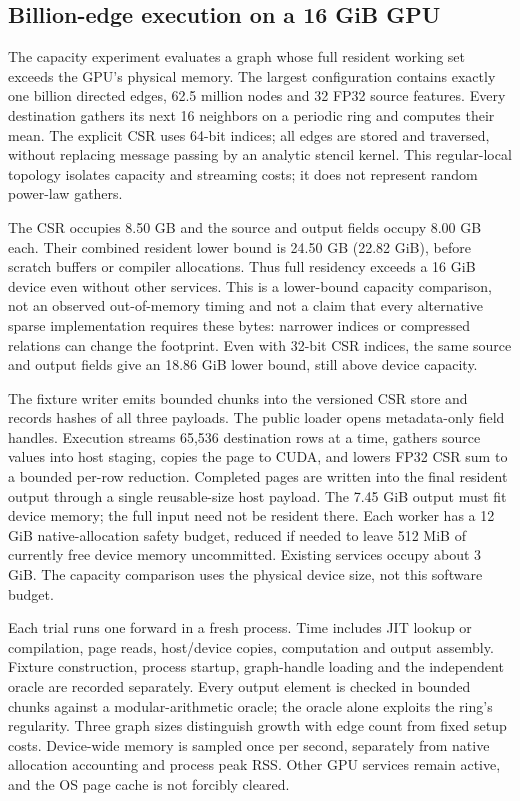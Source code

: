 \subsection{Billion-edge execution on a 16 GiB GPU}
\label{sec:gpu-paging}
The capacity experiment evaluates a graph whose full resident working set
exceeds the GPU's physical memory. The largest configuration contains exactly
one billion directed edges, 62.5 million nodes and 32 FP32 source features.
Every destination gathers its next 16 neighbors on a periodic ring and computes
their mean. The explicit CSR uses 64-bit indices; all edges are stored and
traversed, without replacing message passing by an analytic stencil kernel.
This regular-local topology isolates capacity and streaming costs; it does not
represent random power-law gathers.

The CSR occupies 8.50 GB and the source and output fields occupy 8.00 GB each.
Their combined resident lower bound is 24.50 GB (22.82 GiB), before scratch
buffers or compiler allocations. Thus full residency exceeds a 16 GiB device
even without other services. This is a lower-bound capacity comparison, not
an observed out-of-memory timing and not a claim that every alternative sparse
implementation requires these bytes: narrower indices or compressed relations
can change the footprint. Even with 32-bit CSR indices, the same source and
output fields give an 18.86 GiB lower bound, still above device capacity.

The fixture writer emits bounded chunks into the versioned CSR store and
records hashes of all three payloads. The public loader opens metadata-only
field handles. Execution streams 65,536 destination rows at a time, gathers
source values into host staging, copies the page to CUDA, and lowers FP32 CSR
sum to a bounded per-row reduction. Completed pages are written into the final
resident output through a single reusable-size host payload. The 7.45 GiB
output must fit device memory; the full input need not be resident there.
Each worker has a 12 GiB native-allocation safety budget, reduced if needed to
leave 512 MiB of currently free device memory uncommitted. Existing services
occupy about 3 GiB. The capacity comparison uses the physical device size,
not this software budget.

Each trial runs one forward in a fresh process. Time includes JIT lookup or
compilation, page reads, host/device copies, computation and output assembly.
Fixture construction, process startup, graph-handle loading and the independent
oracle are recorded separately. Every output element is checked in bounded
chunks against a modular-arithmetic oracle; the oracle alone exploits the
ring's regularity. Three graph sizes distinguish growth with edge count from
fixed setup costs. Device-wide memory is sampled once per second, separately
from native allocation accounting and process peak RSS. Other GPU services
remain active, and the OS page cache is not forcibly cleared.

